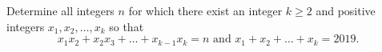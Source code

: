 Determine all integers $n$ for which there exist an integer $k\geq 2$ and positive integers $x_1,x_2,\hdots,x_k$ so that$$x_1x_2+x_2x_3+\hdots+x_{k-1}x_k=n\text{ and } x_1+x_2+\hdots+x_k=2019.$$